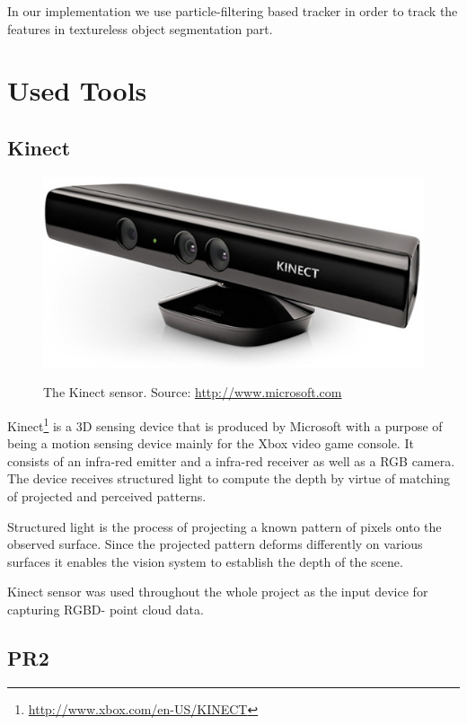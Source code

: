 In our implementation we use particle-filtering based tracker in order to track the features in textureless object segmentation part.      



\section{Used Tools}
\subsection{Kinect}

\begin{figure}
\centering

{\includegraphics[width=0.5\columnwidth]{figures/kinect.jpg}}

\caption{The Kinect sensor. Source: \url{http://www.microsoft.com}}
\label{fig:kinect}
\end{figure}

Kinect\footnote{\url{http://www.xbox.com/en-US/KINECT}} is a 3D sensing device that is produced by Microsoft with a purpose of being a motion sensing device mainly for the Xbox video game console. It consists of an infra-red emitter and a infra-red receiver as well as a RGB camera. The device receives structured light to compute the depth by virtue of matching of projected and perceived patterns.

Structured light is the process of projecting a known pattern of pixels onto the observed surface. Since the projected pattern deforms differently on various surfaces it enables  the vision system to establish the depth of the scene.

Kinect sensor was used throughout the whole project as the input device for capturing RGBD- point cloud  data.

\subsection{PR2}

